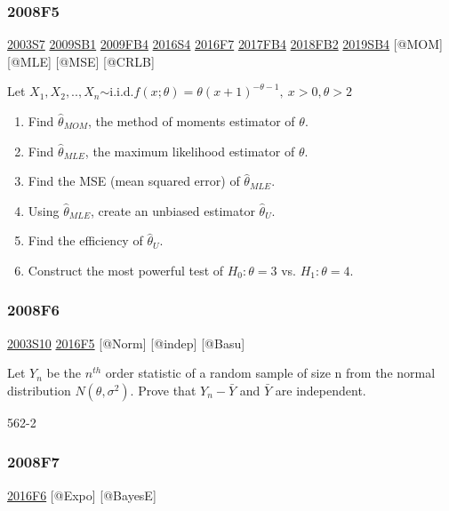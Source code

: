 \documentclass[6pt,twocolumn,Portrait]{article}
\begin{document}
\hypertarget{f5-3}{%
\subsubsection{2008F5}\label{f5-3}}

\protect\hyperlink{s7}{2003S7} \protect\hyperlink{sb1}{2009SB1}
\protect\hyperlink{fb4}{2009FB4} \protect\hyperlink{s4-4}{2016S4}
\protect\hyperlink{f7-5}{2016F7} \protect\hyperlink{fb4-3}{2017FB4}
\protect\hyperlink{fb2-4}{2018FB2} \protect\hyperlink{sb4-2}{2019SB4}
{[}@MOM{]} {[}@MLE{]} {[}@MSE{]} {[}@CRLB{]}

Let
\(X_1,X_2,..,X_n\)\(\sim\)i.i.d.\(f(x;\theta)=\theta(x+1)^{-\theta-1},\ x>0,\theta>2\)

\begin{enumerate}
\def\labelenumi{\alph{enumi}.}
\item
  Find \(\hat\theta_{MOM}\), the method of moments estimator of
  \(\theta\).
\item
  Find \(\hat\theta_{MLE}\), the maximum likelihood estimator of
  \(\theta\).
\item
  Find the MSE (mean squared error) of \(\hat\theta_{MLE}\).
\item
  Using \(\hat\theta_{MLE}\), create an unbiased estimator
  \(\hat\theta_{U}\).
\item
  Find the efficiency of \(\hat\theta_{U}\).
\item
  Construct the most powerful test of \(H_0:\theta=3\) vs.
  \(H_1:\theta=4\).
\end{enumerate}

\hypertarget{f6-3}{%
\subsubsection{2008F6}\label{f6-3}}

\protect\hyperlink{s10}{2003S10} \protect\hyperlink{f5-6}{2016F5}
{[}@Norm{]} {[}@indep{]} {[}@Basu{]}

Let \(Y_n\) be the \(n^{th}\) order statistic of a random sample of size
n from the normal distribution \(N(\theta,\sigma^2)\). Prove that
\(Y_n-\bar Y\) and \(\bar Y\) are independent.

562-2

\hypertarget{f7-3}{%
\subsubsection{2008F7}\label{f7-3}}

\protect\hyperlink{f6-5}{2016F6} {[}@Expo{]} {[}@BayesE{]}
\end{document}
